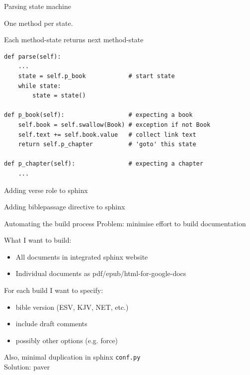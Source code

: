 \documentclass{beamer}
\begin{document}
\begin{frame}[fragile]{Parsing state machine}

One method per state.

Each method-state returns next method-state

\begin{verbatim}
def parse(self):
    ...
    state = self.p_book            # start state
    while state:
        state = state()
		
def p_book(self):                  # expecting a book
    self.book = self.swallow(Book) # exception if not Book
    self.text += self.book.value   # collect link text
    return self.p_chapter          # 'goto' this state
	
def p_chapter(self):               # expecting a chapter
    ...
\end{verbatim}
\end{frame}

\begin{frame}{Adding verse role to sphinx}
\end{frame}

\begin{frame}{Adding biblepassage directive to sphinx}
\end{frame}

\begin{frame}{Automating the build process}
Problem: minimise effort to build documentation

What I want to build:
\begin{itemize}
\item All documents in integrated sphinx website
\item Individual documents as pdf/epub/html-for-google-docs
\end{itemize}
For each build I want to specify:
\begin{itemize}
\item bible version (ESV, KJV, NET, etc.)
\item include draft comments
\item possibly other options (e.g. force)
\end{itemize}
Also, minimal duplication in sphinx \texttt{conf.py}\\

Solution: paver

\end{frame}
\end{document}
